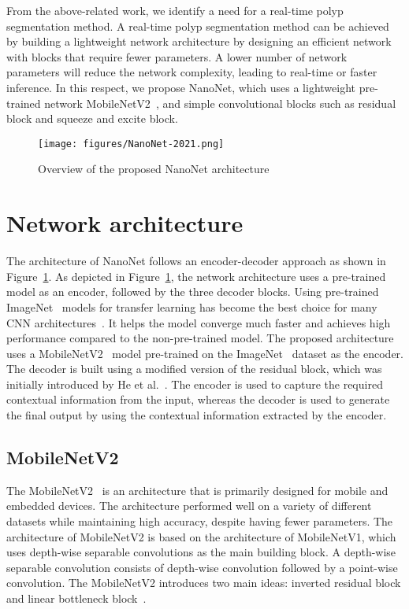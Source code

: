 \documentclass[journal]{IEEEtran}
\begin{document}
From the above-related work, we identify a need for a real-time polyp segmentation method. A real-time polyp segmentation method can be achieved by building a lightweight network architecture by designing an efficient network with blocks that require fewer parameters. A lower number of network parameters will reduce the network complexity, leading to real-time or faster inference. In this respect, we propose NanoNet, which uses a lightweight pre-trained network MobileNetV2~\cite{sandler2018mobilenetv2}, and simple convolutional blocks such as residual block and squeeze and excite block.


\begin{figure}[t!]
    \centering
    \texttt{[image: figures/NanoNet-2021.png]}
    \caption{Overview of the proposed NanoNet architecture}
\label{fig:nanonet}
\end{figure}
\section{Network architecture}
The architecture of NanoNet follows an encoder-decoder approach as shown in Figure~\ref{fig:nanonet}. As depicted in Figure~\ref{fig:nanonet}, the network architecture uses a pre-trained model as an encoder, followed by the three decoder blocks. Using pre-trained ImageNet~\cite{deng2009imagenet} models for transfer learning has become the best choice for many \ac{CNN} architectures~\cite{jha2020doubleUNet,chen2017deeplab}. It helps the model converge much faster and achieves high performance compared to the non-pre-trained model. The proposed architecture uses a MobileNetV2~\cite{sandler2018mobilenetv2} model pre-trained on the ImageNet~\cite{deng2009imagenet} dataset as the encoder. The decoder is built using a modified version of the residual block, which was initially introduced by He et al.~\cite{he2016deep}. The encoder is used to capture the required contextual information from the input, whereas the decoder is used to generate the final output by using the contextual information extracted by the encoder. 

\subsection{MobileNetV2}
The MobileNetV2~\cite{sandler2018mobilenetv2} is an architecture that is primarily designed for mobile and embedded devices. The architecture performed well on a variety of different datasets while maintaining high accuracy, despite having fewer parameters. The architecture of MobileNetV2 is based on the architecture of MobileNetV1, which uses depth-wise separable convolutions as the main building block. A depth-wise separable convolution consists of depth-wise convolution followed by a point-wise convolution. The MobileNetV2 introduces two main ideas: inverted residual block and linear bottleneck block~\cite{sandler2018mobilenetv2}. 
\end{document}
